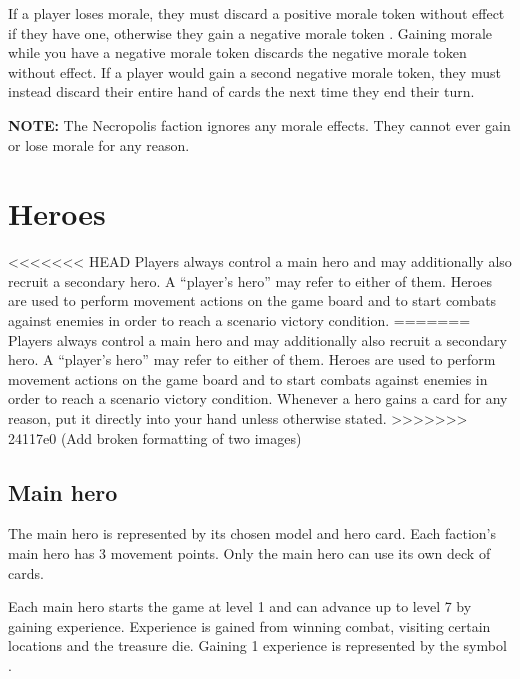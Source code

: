 \documentclass[12pt]{article}
\def\assets{assets}
\def\svgs{\assets/svgs}
\begin{document}
If a player loses morale, they must discard a positive morale token  without effect if they have one, otherwise they gain a negative morale token . Gaining morale while you have a negative morale token discards the negative morale token without effect. If a player would gain a second negative morale token, they must instead discard their entire hand of cards the next time they end their turn.\par
\textbf{NOTE:} The Necropolis faction ignores any morale effects. They cannot ever gain or lose morale for any reason.\\[12pt]


\clearpage

\section[Heroes]{Heroes\hypertarget{Heroes}{}}
<<<<<<< HEAD
Players always control a main hero and may additionally also recruit a secondary hero. A “player’s hero” may refer to either of them. Heroes are used to perform movement actions on the game board and to start combats against enemies in order to reach a scenario victory condition.
=======
Players always control a main hero and may additionally also recruit a secondary hero. A “player’s hero” may refer to either of them. Heroes are used to perform movement actions on the game board and to start combats against enemies in order to reach a scenario victory condition. Whenever a hero gains a card for any reason, put it directly into your hand unless otherwise stated.
>>>>>>> 24117e0 (Add broken formatting of two images)
\subsection*{Main hero}

The main hero is represented by its chosen model and hero card. Each faction’s main hero has 3 movement points. Only the main hero can use its own deck of cards.\par
Each main hero starts the game at level 1 and can advance up to level 7 by gaining experience. Experience is gained from winning combat, visiting certain locations and the treasure die. Gaining 1 experience is represented by the symbol .
\end{document}
